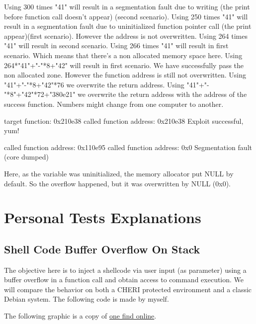 \documentclass[a4paper, 11pt]{article}
\begin{document}
	
		Using 300 times "41" will result in a segmentation fault due to writing (the print before function call doesn't appear) (second scenario).
		Using 250 times "41" will result in a segmentation fault due to uninitialized function pointer call (the print appear)(first scenario). However the address is not overwritten.
		Using 264 times "41" will result in second scenario. Using 266 times "41" will result in first scenario. Which means that there's a non allocated memory space here.
		Using 264*"41"+"-"*8+"42" will result in first scenario. We have successfully pass the non allocated zone. However the function address is still not overwritten.
		Using "41"+"-"*8+"42"*76 we overwrite the return address.
		Using "41"+"-"*8"+"42"*72+"380e21" we overwrite the return address with the address of the success function.
		Numbers might change from one computer to another.
		\begin{tcolorbox}[colback=gray!5!white, colframe=gray!75!black, title=baseline RISC-V environment ]
			target function: 0x210e38
			called function address: 0x210e38
			Exploit successful, yum!
		\end{tcolorbox}
		\begin{tcolorbox}[colback=gray!5!white, colframe=blue!75!black, title=CHERI-RISC-V environment]
			called function address: 0x110e95
			called function address: 0x0
			Segmentation fault (core dumped)
		\end{tcolorbox}
		Here, as the variable was uninitialized, the memory allocator put NULL by default.
		So the overflow happened, but it was overwritten by NULL (0x0).
	
\section{Personal Tests Explanations}
\subsection{Shell Code Buffer Overflow On Stack}
The objective here is to inject a shellcode via user input (as parameter) using a buffer overflow in a function call and obtain access to command execution.
We will compare the behavior on both a CHERI protected environment and a classic Debian system.
The following code is made by myself.

The following graphic is a copy of \href{https://hg8.sh/posts/binary-exploitation/buffer-overflow-code-execution-by-shellcode-injection/}{one find online}.
\end{document}
